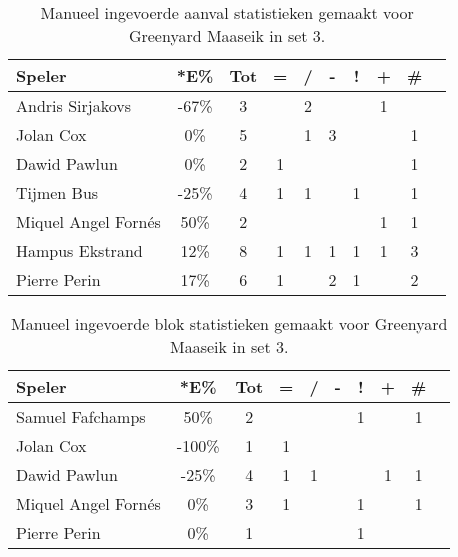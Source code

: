 \begin{table}[ht!]
    \centering
    \scriptsize
    \begin{tabular}{|l|c|c|c|c|c|c|c|c|c|}
        \hline
        \textbf{Speler} & *E\% & Tot & = & / & - & ! & + & \#\\ \hline
        Andris Sirjakovs & -67\% & 3 &  & 2 &  &  & 1 &  \\ 
        Jolan Cox & 0\% & 5 &  & 1 & 3 &  &  & 1 \\ 
        Dawid Pawlun & 0\% & 2 & 1 &  &  &  &  & 1 \\ 
        Tijmen Bus & -25\% & 4 & 1 & 1 &  & 1 &  & 1 \\ 
        Miquel Angel Fornés & 50\% & 2 &  &  &  &  & 1 & 1 \\ 
        Hampus Ekstrand & 12\% & 8 & 1 & 1 & 1 & 1 & 1 & 3 \\ 
        Pierre Perin  & 17\% & 6 & 1 &  & 2 & 1 &  & 2 \\ \hline
    \end{tabular}
   \caption[Manueel ingevoerde aanvalsstatistieken gemaakt Greenyard Maaseik in set 3]{\label{tab:PL1AttMaaseikMan3}Manueel ingevoerde aanval statistieken gemaakt voor Greenyard Maaseik in set 3.}
\end{table}

\begin{table}[ht!]
    \centering
    \scriptsize
    \begin{tabular}{|l|c|c|c|c|c|c|c|c|c|}
        \hline
        \textbf{Speler} & *E\% & Tot & = & / & - & ! & + & \#\\ \hline
        Samuel Fafchamps & 50\% & 2 &  &  &  & 1 &  & 1 \\ 
        Jolan Cox & -100\% & 1 & 1 &  &  &  &  &  \\
        Dawid Pawlun & -25\% & 4 & 1 & 1 &  &  & 1 & 1 \\
        Miquel Angel Fornés & 0\% & 3 & 1 &  &  & 1 &  & 1 \\ 
        Pierre Perin & 0\% & 1 &  &  &  & 1 &  &  \\ \hline
    \end{tabular}
    \caption[Manueel ingevoerde blokstatistieken gemaakt Greenyard Maaseik in set 3]{\label{tab:PL1BlockMaaseikMan3}Manueel ingevoerde blok statistieken gemaakt voor Greenyard Maaseik in set 3.}
\end{table}

